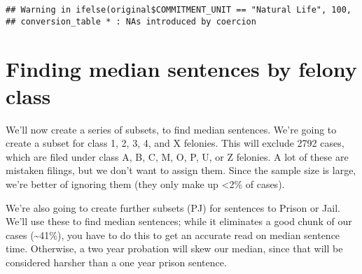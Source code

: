 \documentclass[
]{article}
\newenvironment{Shaded}{\begin{snugshade}}{\end{snugshade}}
\newcommand{\KeywordTok}[1]{\textcolor[rgb]{0.13,0.29,0.53}{\textbf{#1}}}
\newcommand{\NormalTok}[1]{#1}
\newcommand{\OperatorTok}[1]{\textcolor[rgb]{0.81,0.36,0.00}{\textbf{#1}}}
\newcommand{\StringTok}[1]{\textcolor[rgb]{0.31,0.60,0.02}{#1}}
\begin{document}
\begin{verbatim}
## Warning in ifelse(original$COMMITMENT_UNIT == "Natural Life", 100,
## conversion_table * : NAs introduced by coercion
\end{verbatim}

\begin{Shaded}
\end{Shaded}

\hypertarget{finding-median-sentences-by-felony-class}{%
\section{Finding median sentences by felony
class}\label{finding-median-sentences-by-felony-class}}

We'll now create a series of subsets, to find median sentences. We're
going to create a subset for class 1, 2, 3, 4, and X felonies. This will
exclude 2792 cases, which are filed under class A, B, C, M, O, P, U, or
Z felonies. A lot of these are mistaken filings, but we don't want to
assign them. Since the sample size is large, we're better of ignoring
them (they only make up \textless2\% of cases).

We're also going to create further subsets (PJ) for sentences to Prison
or Jail. We'll use these to find median sentences; while it eliminates a
good chunk of our cases (\textasciitilde41\%), you have to do this to
get an accurate read on median sentence time. Otherwise, a two year
probation will skew our median, since that will be considered harsher
than a one year prison sentence.
\end{document}
